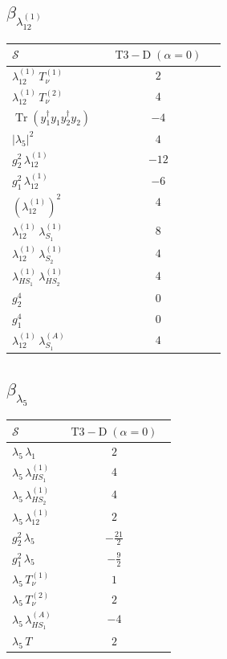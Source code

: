 \documentclass[9pt]{article}
\begin{document}
\subsection*{$ \beta_{\lambda_{12}^{(1)}} $}
\begin{longtable}{@{}p{0.31\linewidth}c@{}}
\toprule
$\mathcal{S}$ & $ \mathrm{T3-D}\;(\alpha=0) $ \\
\midrule
$ \lambda_{12}^{(1)}\,T_{\nu}^{(1)} $ & $ 2 $ \\
$ \lambda_{12}^{(1)}\,T_{\nu}^{(2)} $ & $ 4 $ \\
$ \operatorname{Tr}(y_1^\dagger y_1y_2^\dagger y_2) $ & $ -4 $ \\
$ |\lambda_5|^2 $ & $ 4 $ \\
$ g_2^2\,\lambda_{12}^{(1)} $ & $ -12 $ \\
$ g_1^2\,\lambda_{12}^{(1)} $ & $ -6 $ \\
$ \left(\lambda_{12}^{(1)}\right)^2 $ & $ 4 $ \\
$ \lambda_{12}^{(1)}\,\lambda_{S_1}^{(1)} $ & $ 8 $ \\
$ \lambda_{12}^{(1)}\,\lambda_{S_2}^{(1)} $ & $ 4 $ \\
$ \lambda_{HS_1}^{(1)}\,\lambda_{HS_2}^{(1)} $ & $ 4 $ \\
$ g_2^4 $ & $ 0 $ \\
$ g_1^4 $ & $ 0 $ \\
$ \lambda_{12}^{(1)}\,\lambda_{S_1}^{(A)} $ & $ 4 $ \\
\bottomrule
\end{longtable}
\subsection*{$ \beta_{\lambda_5} $}
\begin{longtable}{@{}p{0.31\linewidth}c@{}}
\toprule
$\mathcal{S}$ & $ \mathrm{T3-D}\;(\alpha=0) $ \\
\midrule
$ \lambda_5\,\lambda_1 $ & $ 2 $ \\
$ \lambda_5\,\lambda_{HS_1}^{(1)} $ & $ 4 $ \\
$ \lambda_5\,\lambda_{HS_2}^{(1)} $ & $ 4 $ \\
$ \lambda_5\,\lambda_{12}^{(1)} $ & $ 2 $ \\
$ g_2^2\,\lambda_5 $ & $ - \frac{21}{2} $ \\
$ g_1^2\,\lambda_5 $ & $ - \frac{9}{2} $ \\
$ \lambda_5\,T_{\nu}^{(1)} $ & $ 1 $ \\
$ \lambda_5\,T_{\nu}^{(2)} $ & $ 2 $ \\
$ \lambda_5\,\lambda_{HS_1}^{(A)} $ & $ -4 $ \\
$ \lambda_5\,T $ & $ 2 $ \\
\bottomrule
\end{longtable}
\end{document}

